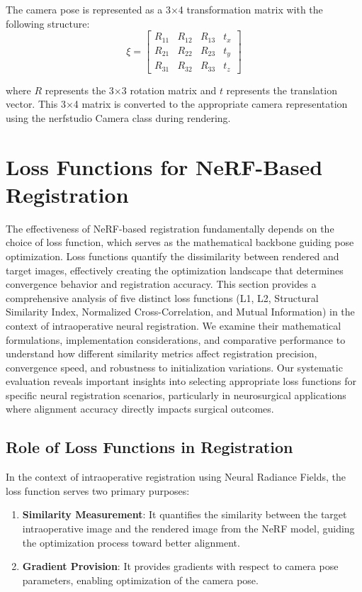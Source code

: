 The camera pose is represented as a 3×4 transformation matrix with the following structure:
\begin{equation}
\xi = \begin{bmatrix} 
R_{11} & R_{12} & R_{13} & t_x \\
R_{21} & R_{22} & R_{23} & t_y \\
R_{31} & R_{32} & R_{33} & t_z
\end{bmatrix}
\end{equation}

where $R$ represents the 3×3 rotation matrix and $t$ represents the translation vector. This 3×4 matrix is converted to the appropriate camera representation using the nerfstudio Camera class during rendering.

\section{Loss Functions for NeRF-Based Registration}\label{section:loss_functions}


The effectiveness of NeRF-based registration fundamentally depends on the choice of loss function, which serves as the mathematical backbone guiding pose optimization. Loss functions quantify the dissimilarity between rendered and target images, effectively creating the optimization landscape that determines convergence behavior and registration accuracy. This section provides a comprehensive analysis of five distinct loss functions (L1, L2, Structural Similarity Index, Normalized Cross-Correlation, and Mutual Information) in the context of intraoperative neural registration. We examine their mathematical formulations, implementation considerations, and comparative performance to understand how different similarity metrics affect registration precision, convergence speed, and robustness to initialization variations. Our systematic evaluation reveals important insights into selecting appropriate loss functions for specific neural registration scenarios, particularly in neurosurgical applications where alignment accuracy directly impacts surgical outcomes.
\subsection{Role of Loss Functions in Registration}

In the context of intraoperative registration using Neural Radiance Fields, the loss function serves two primary purposes:

\begin{enumerate}
    \item \textbf{Similarity Measurement}: It quantifies the similarity between the target intraoperative image and the rendered image from the NeRF model, guiding the optimization process toward better alignment.
    
    \item \textbf{Gradient Provision}: It provides gradients with respect to camera pose parameters, enabling optimization of the camera pose.
\end{enumerate}

